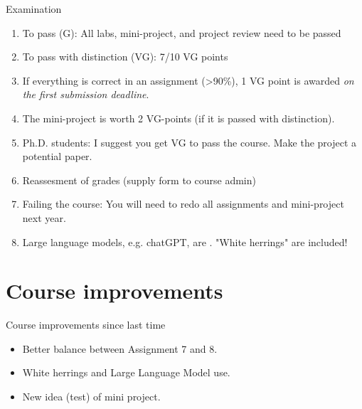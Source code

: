 \documentclass[10pt]{beamer}
\begin{document}
\begin{frame}{Examination}

\begin{enumerate}
\item To pass (G): All labs, mini-project, and project review need to be passed\pause
\item To pass with distinction (VG): 7/10 VG points\pause
\item If everything is correct in an assignment (>90\%), 1 VG point is awarded \emph{on the first submission deadline}.\pause
\item The mini-project is worth 2 VG-points (if it is passed with distinction).
\item Ph.D. students: I suggest you get VG to pass the course. Make the project a potential paper.
\item Reassesment of grades (supply form to course admin)
\item Failing the course: You will need to redo all assignments and mini-project next year.
\item Large language models, e.g. chatGPT, are . "White herrings" are included!
\end{enumerate}

\end{frame}

\section{Course improvements}
\frame{\sectionpage}

\begin{frame}{Course improvements since last time}


\begin{itemize}
  \item Better balance between Assignment 7 and 8.
  \item White herrings and Large Language Model use.
  \item New idea (test) of mini project.
\end{itemize}

\end{frame}


\frame{\sectionpage}
\end{document}
